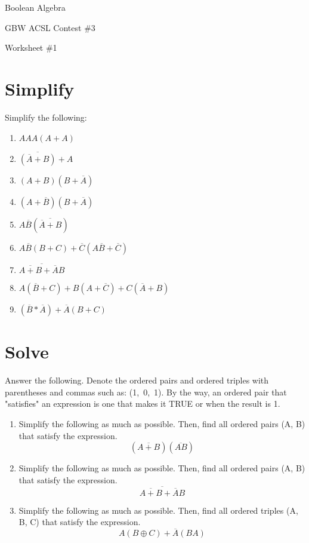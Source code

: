 \documentclass{article}
\begin{document}
\centerline{\sc \large Boolean Algebra}
\vspace{.5pc}
\centerline{\sc GBW ACSL Contest \#3}
\vspace{.5pc}
\centerline{\sc Worksheet \#1}
\vspace{2pc}
\section{Simplify}

Simplify the following:
\begin{enumerate}
  \item $ AAA(A + A) $

  \item $ \overline{(\overline{A} + B)} + A $

  \item
  $ (A + B)(B + \overline{A}) $

  \item
  $ (A + \overline{B})(B + \overline{A}) $

  \item
  $ A\overline{B}(\overline{\overline{A} + B}) $

  \item
  $ A \overline{B}(B + C) +
  \overline{C} (A \overline{B} + \overline{C})$

  \item $ \overline{\overline{A + B} + \overline{A}B} $

  \item $ A(\overline{B} + C)
          + B(A + \overline{C})
          + C(\overline{A} + B)$

  \item $ (\overline{B} * \overline{A}) + \overline{A}(B + C) $
\end{enumerate}


\section{Solve}

Answer the following. Denote the ordered pairs and ordered triples with
parentheses and commas such as: \mbox{(1, 0, 1)}.  By the way, an
ordered pair that "satisfies" an expression is one that makes it TRUE or
when the result is 1.

\begin{enumerate}
  \item Simplify the following as much as possible.  Then, find all ordered pairs (A, B) that satisfy the expression.
 \[ (\overline{A + B})(\overline{AB}) \]

 \item Simplify the following as much as possible.  Then, find all ordered pairs (A, B) that satisfy the expression.
 \[ \overline{\overline{A + B}+ \overline{A}B} \]

  \item Simplify the following as much as possible.  Then, find all ordered triples (A, B, C) that satisfy the expression.
  \[ A(B\oplus{}C) + \overline{A}(BA)\]

\end{enumerate}
\end{document}
